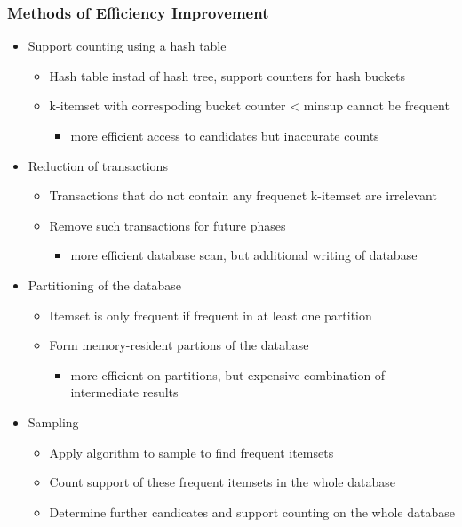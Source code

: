 \documentclass{article}
\begin{document}
\subsubsection{Methods of Efficiency Improvement}
\begin{itemize}
  \item Support counting using a hash table
  \begin{itemize}
    \item Hash table instad of hash tree, support counters for hash buckets
    \item k-itemset with correspoding bucket counter < minsup cannot be frequent
    \begin{itemize}
      \item more efficient access to candidates but inaccurate counts
    \end{itemize}
  \end{itemize}

  \item Reduction of transactions
  \begin{itemize}
    \item Transactions that do not contain any frequenct k-itemset are irrelevant
    \item Remove such transactions for future phases
    \begin{itemize}
      \item more efficient database scan, but additional writing of database
    \end{itemize}
  \end{itemize}

  \item Partitioning of the database
  \begin{itemize}
    \item Itemset is only frequent if frequent in at least one partition
    \item Form memory-resident partions of the database
    \begin{itemize}
      \item more efficient on partitions, but expensive combination of intermediate results
    \end{itemize}
  \end{itemize}

  \item Sampling
  \begin{itemize}
    \item Apply algorithm to sample to find frequent itemsets
    \item Count support of these frequent itemsets in the whole database
    \item Determine further candicates and support counting on the whole database
  \end{itemize}
\end{itemize}
\end{document}
